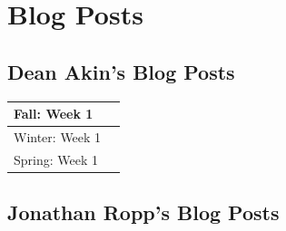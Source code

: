 \documentclass[onecolumn, draftclsnofoot,10pt, compsoc]{IEEEtran}
\begin{document}
\section{Blog Posts}
\subsection* {Dean Akin's Blog Posts}
\begin{longtable} {|p{1.5cm}|p{13.5cm}|} \hline
Fall: Week 1 & \\ \hline
Winter: Week 1 & \\ \hline
Spring: Week 1 & \\ \hline
\end{longtable}


\subsection* {Jonathan Ropp's Blog Posts}
\end{document}
